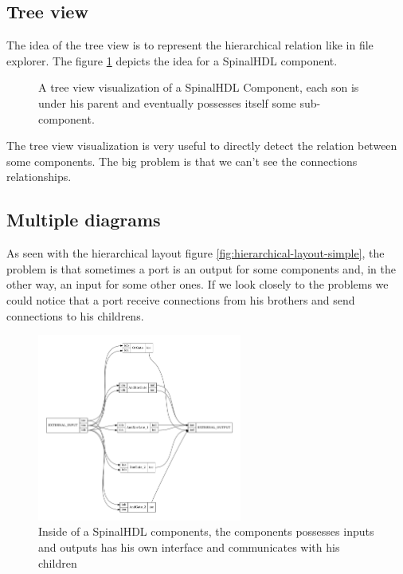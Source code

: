 \subsection{Tree view}

The idea of the tree view is to represent the hierarchical relation like in file
explorer. The figure \ref{fig:tree-view} depicts the idea for a SpinalHDL
component.

\begin{figure}[H]
  \centering
  \caption[SpinalHDL's Component visualization with tree view]{A tree view
    visualization of a SpinalHDL Component, each son is under his parent and
    eventually possesses itself some sub-component.}
  \label{fig:tree-view}
\end{figure}

The tree view visualization is very useful to directly detect the relation
between some components. The big problem is that we can't see the connections
relationships.

\subsection{Multiple diagrams}

As seen with the hierarchical layout figure
\ref{fig:hierarchical-layout-simple}, the problem is that sometimes a port is an
output for some components and, in the other way, an input for some other
ones. If we look closely to the problems we could notice that a port receive
connections from his brothers and send connections to his childrens.

\begin{figure}[H]
  \centering
  \includegraphics[width=0.6\textwidth]{img/HierarchicComponent.pdf}
  \caption[SpinalHDL Component inside]{Inside of a SpinalHDL components, the
    components possesses inputs and outputs has his own interface and communicates
  with his children}
  \label{fig:hierarchic-component}
\end{figure}


